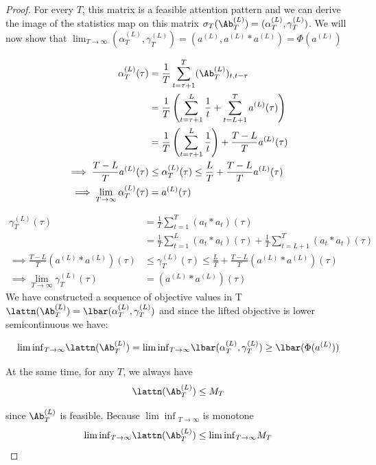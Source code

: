 \documentclass{article}
\begin{document}
\begin{proof}
For every $T$, this matrix is a feasible attention pattern and we can derive the image of the statistics map on this matrix $\sigma_T(\Ab^{(L)}_T) = (\alpha^{(L)}_T, \gamma^{(L)}_T)$. We will now show that $\lim_{T\to \infty}(\alpha^{(L)}_T, \gamma^{(L)}_T) = (a^{(L)}, a^{(L)}\ast a^{(L)}) = \Phi(a^{(L)})$

\begin{align}
    \alpha^{(L)}_T(\tau) &= \frac{1}{T}\sum_{t=\tau+1}^T(\Ab^{(L)}_{T})_{t, t-\tau} \\
    &= \frac{1}{T}\left( \sum_{t = \tau+1}^L \frac{1}{t} + \sum_{t = L+1}^T a^{(L)}(\tau)\right) \\
    &=\frac{1}{T}\left( \sum_{t = \tau+1}^L \frac{1}{t} \right) + \frac{T-L}{T}a^{(L)}(\tau) \\
    \implies \frac{T-L}{T}a^{(L)}(\tau) &\le  \alpha^{(L)}_T(\tau) \le \frac{L}{T} + \frac{T-L}{T}a^{(L)}(\tau) \\
    \implies \lim_{T\to \infty}\alpha^{(L)}_T(\tau) &= a^{(L)}(\tau)
\end{align}

\begin{align}
    \gamma^{(L)}_T(\tau) &= \frac{1}{T}\sum_{t=1}^T(a_t \ast a_t)(\tau) \\
    &=  \frac{1}{T}\sum_{t=1}^L(a_t \ast a_t)(\tau) +  \frac{1}{T}\sum_{t=L+1}^T(a_t \ast a_t)(\tau) \\
    \implies \frac{T-L}{T}(a^{(L)}\ast a^{(L)})(\tau)  &\le  \gamma^{(L)}_T(\tau) \le \frac{L}{T} + \frac{T-L}{T}(a^{(L)}\ast a^{(L)})(\tau)  \\
    \implies \lim_{T\to \infty}\gamma^{(L)}_T(\tau) &= (a^{(L)}\ast a^{(L)})(\tau)  
\end{align}
We have constructed a sequence of objective values in T $\lattn(\Ab^{(L)}_T) = \lbar(\alpha^{(L)}_T, \gamma^{(L)}_T)$ and since the lifted objective is lower semicontinuous we have:

\begin{equation}
    {\lim\inf}_{T \to \infty}\lattn(\Ab_T^{(L)}) = {\lim\inf}_{T \to \infty} \lbar(\alpha^{(L)}_T, \gamma^{(L)}_T) \ge \lbar(\Phi(a^{(L)}))
\end{equation}

At the same time, for any $T$, we always have 
\begin{equation}
    \lattn(\Ab_T^{(L)}) \le M_T
\end{equation}

since $\Ab_T^{(L)}$ is feasible. Because ${\lim\inf}_{T\to\infty}$ is monotone
\begin{equation}
    {\lim\inf}_{T\to\infty}\lattn(\Ab_T^{(L)}) \le {\lim\inf}_{T\to\infty}M_T
\end{equation}


\end{proof}
\end{document}
